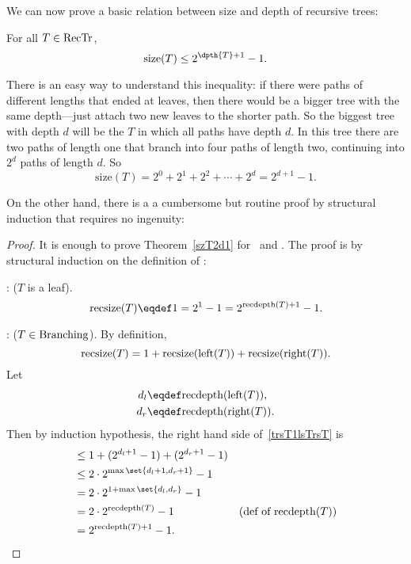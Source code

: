 \begin{definition}
We can now prove a basic relation between size and depth of recursive
trees:
\begin{theorem}\label{szT2d1}
For all $T \in \text{RecTr}$,
\[
\text{size}(T) \leq 2^{\dpth{T}+1} - 1.
\]
\end{theorem}

There is an easy way to understand this inequality: if there were
paths of different lengths that ended at leaves, then there would be a
bigger tree with the same depth---just attach two new leaves to the
shorter path.  So the biggest tree with depth $d$ will be the
 $T$ in which all paths have depth $d$.  In this
tree there are two paths of length one that branch into four
paths of length two, continuing into $2^d$ paths of length $d$.  So
\[
\text{size}(T) = 2^0 + 2^1 + 2^2 + \cdots + 2^d = 2^{d+1}-1.
\]

On the other hand, there is a a cumbersome but routine proof by
structural induction that requires no ingenuity:

\begin{proof} 
It is enough to prove Theorem~\ref{szT2d1} for \trsize\ and \trdpth.
The proof is by structural induction on the definition of \rectr:

: ($T$ is a leaf).
\[
\trsize{(T)} \eqdef 1 = 2^1 - 1 = 2^{\trdpth{(T)}+1} - 1.
\]

: ($T \in \text{Branching}$).
By definition,
\begin{equation}\label{trsT1lsTrsT}
\text{recsize}(T) = 1 + \text{recsize}(\text{left}(T)) + \text{recsize}(\text{right}(T)).
\end{equation}
Let
\begin{align*}
d_l & \eqdef \trdpth{(\leftsub{(T)})},\\
d_r & \eqdef \trdpth{(\rightsub{(T)})}.
\end{align*}
Then by induction hypothesis, the right hand side of~\eqref{trsT1lsTrsT} is
\begin{align*}
& \leq 1 + (2^{d_l+1} -1)  + (2^{d_r+1} -1)\\
& \leq  2\cdot 2^{\max\set{d_l+1,d_r+1}} - 1\\
& = 2\cdot 2^{1+\max\set{d_l,d_r}} - 1\\
& = 2\cdot 2^{\trdpth{(T)}} - 1
              & \text{(def of $\trdpth{(T)}$)}\\
& =  2^{\trdpth{(T)}+1} - 1.
\end{align*}
\end{proof}


\end{definition}
